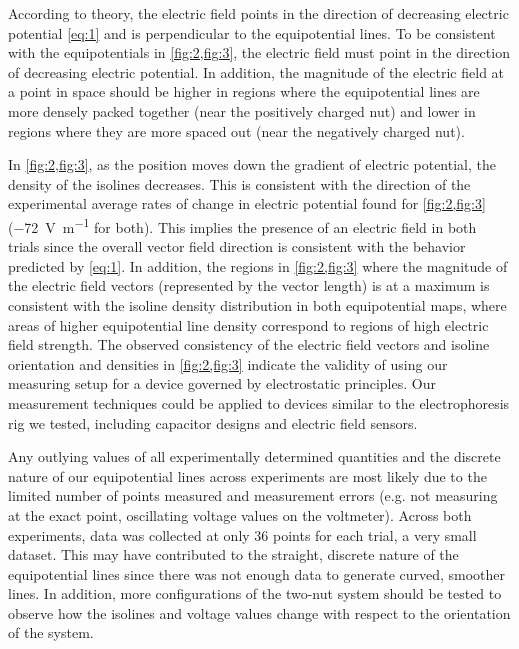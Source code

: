 \documentclass[10pt,journal,twoside]{IEEEtran}
\begin{document}
According to theory, the electric field points in the direction of decreasing electric potential \cref{eq:1} and is perpendicular to the equipotential lines. %
To be consistent with the equipotentials in \cref{fig:2,fig:3}, the electric field must point in the direction of decreasing electric potential. In addition, the magnitude of the electric field at a point in space should be higher in regions where the equipotential lines are more densely packed together (near the positively charged nut) and lower in regions where they are more spaced out (near the negatively charged nut).

In \cref{fig:2,fig:3}, as the position moves down the gradient of electric potential, the density of the isolines decreases. This is consistent with the direction of the experimental average rates of change in electric potential found for \cref{fig:2,fig:3} (\qty{-72}{\volt\per\meter} for both). This implies the presence of an electric field in both trials since the overall vector field direction is consistent with the behavior predicted by \cref{eq:1}. In addition, the regions in \cref{fig:2,fig:3} where the magnitude of the electric field vectors (represented by the vector length) is at a maximum is consistent with the isoline density distribution in both equipotential maps, where areas of higher equipotential line density correspond to regions of high electric field strength. The observed consistency of the electric field vectors and isoline orientation and densities in \cref{fig:2,fig:3} indicate the validity of using our measuring setup for a device governed by electrostatic principles. Our measurement techniques could be applied to devices similar to the electrophoresis rig we tested, including capacitor designs and electric field sensors. 

Any outlying values of all experimentally determined quantities and the discrete nature of our equipotential lines across experiments are most likely due to the limited number of points measured and measurement errors (e.g. not measuring at the exact point, oscillating voltage values on the voltmeter). Across both experiments, data was collected at only 36 points for each trial, a very small dataset. This may have contributed to the straight, discrete nature of the equipotential lines since there was not enough data to generate curved, smoother lines. In addition, more configurations of the two-nut system should be tested to observe how the isolines and voltage values change with respect to the orientation of the system.
\end{document}
